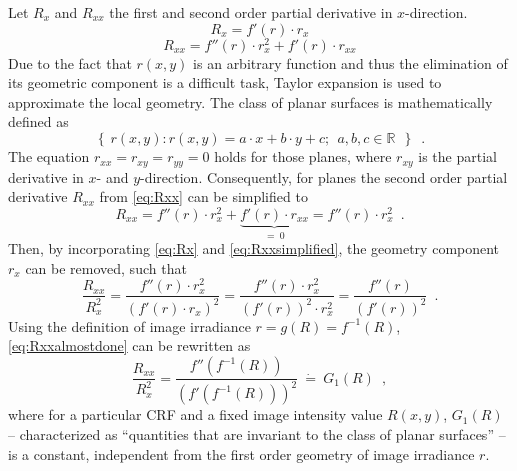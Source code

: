 Let $R_x$ and $R_{xx}$ the first and second order partial derivative in $x$-direction.
\begin{equation}
	R_x = f'(r) \cdot r_x
	\label{eq:Rx}
\end{equation}
\begin{equation}
	R_{xx} = f''(r) \cdot r_x^2 + f'(r) \cdot r_{xx}
	\label{eq:Rxx}
\end{equation}
Due to the fact that $r(x,y)$ is an arbitrary function and thus the elimination of its geometric component is a difficult task, Taylor expansion is used to approximate the local geometry. The class of planar surfaces is mathematically defined as
\begin{equation}
	\left\{\ r(x,y) : r(x,y) = a \cdot x + b \cdot y + c;\ \ a,b,c \in \mathbb{R}\ \ \right\} \enspace .
	\label{eq:classofplanarsurfaces}
\end{equation}
The equation $r_{xx} = r_{xy} = r_{yy} = 0$ holds for those planes, where $r_{xy}$ is the partial derivative in $x$- and $y$-direction. Consequently, for planes the second order partial derivative $R_{xx}$ from \autoref{eq:Rxx} can be simplified to
\begin{equation}
	R_{xx} = f''(r) \cdot r_x^2 + \underbrace{f'(r) \cdot r_{xx}}_{= \ 0} = f''(r) \cdot r_x^2 \enspace .
	\label{eq:Rxxsimplified}
\end{equation}
Then, by incorporating \autoref{eq:Rx} and \autoref{eq:Rxxsimplified}, the geometry component $r_x$ can be removed, such that
\begin{equation}
	\frac{R_{xx}}{R_x^2} = \frac{f''(r) \cdot r_x^2}{(f'(r) \cdot r_x)^2} = \frac{f''(r) \cdot r_x^2}{(f'(r))^2 \cdot r_x^2} = \frac{f''(r)}{(f'(r))^2} \enspace .
	\label{eq:Rxxalmostdone}
\end{equation}
Using the definition of image irradiance $r = g(R) = f^{-1}(R)$, \autoref{eq:Rxxalmostdone} can be rewritten as
\begin{equation}
	\frac{R_{xx}}{R_x^2} = \frac{f''(f^{-1}(R))}{(f'(f^{-1}(R)))^2} \ \dot{=} \ G_1(R) \enspace ,
	\label{eq:Rxxdone}
\end{equation}
where for a particular CRF and a fixed image intensity value $R(x,y)$, $G_1(R)$ -- characterized as ``quantities that are invariant to the class of planar surfaces'' -- is a constant, independent from the first order geometry of image irradiance $r$.


